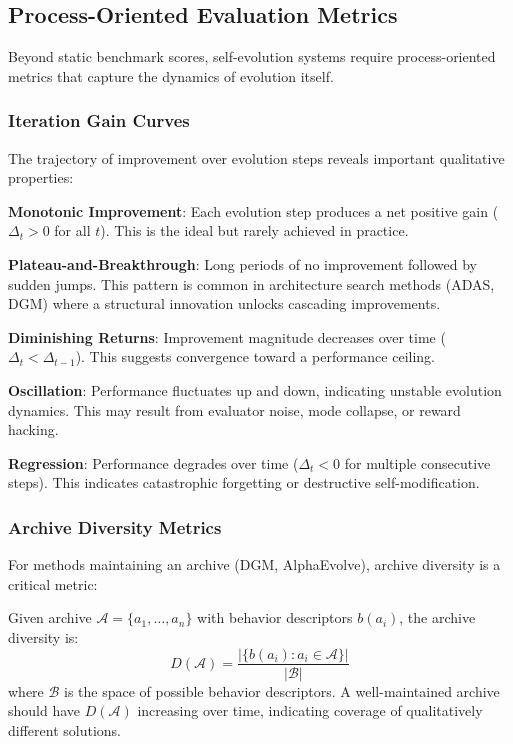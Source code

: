 \subsection{Process-Oriented Evaluation Metrics}\label{sec:ch5-process}

Beyond static benchmark scores, self-evolution systems require process-oriented metrics that capture the dynamics of evolution itself.

\subsubsection{Iteration Gain Curves}

The trajectory of improvement over evolution steps reveals important qualitative properties:

\textbf{Monotonic Improvement}: Each evolution step produces a net positive gain ($\Delta_t > 0$ for all $t$). This is the ideal but rarely achieved in practice.

\textbf{Plateau-and-Breakthrough}: Long periods of no improvement followed by sudden jumps. This pattern is common in architecture search methods (ADAS, DGM) where a structural innovation unlocks cascading improvements.

\textbf{Diminishing Returns}: Improvement magnitude decreases over time ($\Delta_t < \Delta_{t-1}$). This suggests convergence toward a performance ceiling.

\textbf{Oscillation}: Performance fluctuates up and down, indicating unstable evolution dynamics. This may result from evaluator noise, mode collapse, or reward hacking.

\textbf{Regression}: Performance degrades over time ($\Delta_t < 0$ for multiple consecutive steps). This indicates catastrophic forgetting or destructive self-modification.

\subsubsection{Archive Diversity Metrics}

For methods maintaining an archive (DGM, AlphaEvolve), archive diversity is a critical metric:

\begin{definition}
Given archive $\mathcal{A} = \{a_1, \ldots, a_n\}$ with behavior descriptors $b(a_i)$, the archive diversity is:
\begin{equation}
D(\mathcal{A}) = \frac{|\{b(a_i) : a_i \in \mathcal{A}\}|}{|\mathcal{B}|}
\label{eq:archive-diversity}
\end{equation}
where $\mathcal{B}$ is the space of possible behavior descriptors. A well-maintained archive should have $D(\mathcal{A})$ increasing over time, indicating coverage of qualitatively different solutions.
\end{definition}

